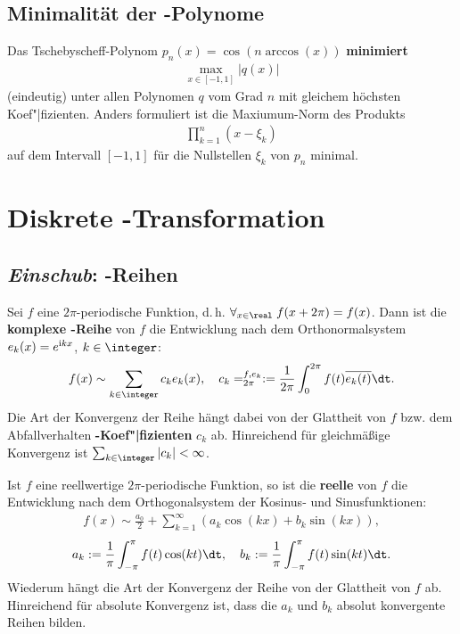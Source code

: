 \subsection{%
    Minimalität der -Polynome%
}

Das Tschebyscheff-Polynom $p_n(x) = \cos(n \arccos(x))$ \textbf{minimiert}
\begin{align*}
    \max_{x \in [-1,1]} |q(x)|
\end{align*}
(eindeutig) unter allen Polynomen $q$ vom Grad $n$ mit gleichem höchsten
Koef"|fizienten.
Anders formuliert ist die Maxiumum-Norm des Produkts
\begin{align*}
    \prod_{k=1}^n (x - \xi_k)
\end{align*}
auf dem Intervall $[-1,1]$ für die Nullstellen $\xi_k$ von $p_n$ minimal.

\pagebreak

\section{%
    Diskrete -Transformation%
}

\setcounter{subsubsection}{-1}

\subsection{%
    \emph{Einschub}: -Reihen%
}

Sei $f$ eine $2\pi$-periodische Funktion, d.\,h.
$\forall_{x \in \real}\; f(x + 2\pi) = f(x)$.
Dann ist die \textbf{komplexe -Reihe} von $f$ die Entwicklung
nach dem Orthonormalsystem $e_k(x) = e^{\mathrm{i} kx}$, $k \in \integer$:
\begin{align*}
    f(x) \sim \sum_{k \in \integer} c_k e_k(x), \quad
    c_k = \sp{f, e_k}_{2\pi} :=
    \frac{1}{2\pi} \int_0^{2\pi} f(t) \overline{e_k(t)} \dt.
\end{align*}
Die Art der Konvergenz der Reihe hängt dabei von der Glattheit von $f$ bzw.
dem Abfallverhalten \textbf{-Koef"|fizienten} $c_k$ ab.
Hinreichend für gleichmäßige Konvergenz ist
$\sum_{k \in \integer} |c_k| < \infty$.

\linie

Ist $f$ eine reellwertige $2\pi$-periodische Funktion, so ist die
\textbf{reelle } von $f$ die Entwicklung nach dem
Orthogonalsystem der Kosinus- und Sinusfunktionen:
\begin{align*}
    f(x) \sim \frac{a_0}{2} + \sum_{k=1}^\infty (a_k \cos(kx) + b_k \sin(kx)),
\end{align*}
\begin{align*}
    a_k := \frac{1}{\pi} \int_{-\pi}^\pi f(t) \cos(kt) \dt, \quad
    b_k := \frac{1}{\pi} \int_{-\pi}^\pi f(t) \sin(kt) \dt.
\end{align*}
Wiederum hängt die Art der Konvergenz der Reihe von der Glattheit von $f$ ab.
Hinreichend für absolute Konvergenz ist, dass die
 $a_k$ und $b_k$ absolut konvergente
Reihen bilden.

